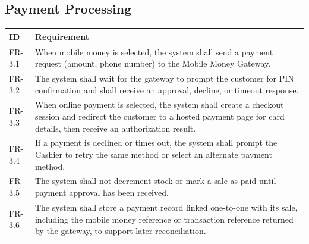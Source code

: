 \documentclass[11pt,a4paper]{report}
\begin{document}
\subsection{Payment Processing}
\begin{longtable}{p{1.6cm} L{11.4cm}}
\toprule
\textbf{ID} & \textbf{Requirement} \\
\midrule
\endhead
FR-3.1 & When mobile money is selected, the system shall send a payment request (amount, phone number) to the Mobile Money Gateway. \\
FR-3.2 & The system shall wait for the gateway to prompt the customer for PIN confirmation and shall receive an approval, decline, or timeout response. \\
FR-3.3 & When online payment is selected, the system shall create a checkout session and redirect the customer to a hosted payment page for card details, then receive an authorization result. \\
FR-3.4 & If a payment is declined or times out, the system shall prompt the Cashier to retry the same method or select an alternate payment method. \\
FR-3.5 & The system shall not decrement stock or mark a sale as paid until payment approval has been received. \\
FR-3.6 & The system shall store a payment record linked one-to-one with its sale, including the mobile money reference or transaction reference returned by the gateway, to support later reconciliation. \\
\bottomrule
\end{longtable}
\end{document}
